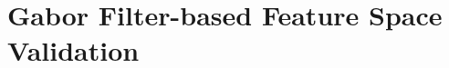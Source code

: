 % 	    
%
%
%    	    
%
%
%
%
%    	    



\section{Gabor Filter-based Feature Space Validation}

